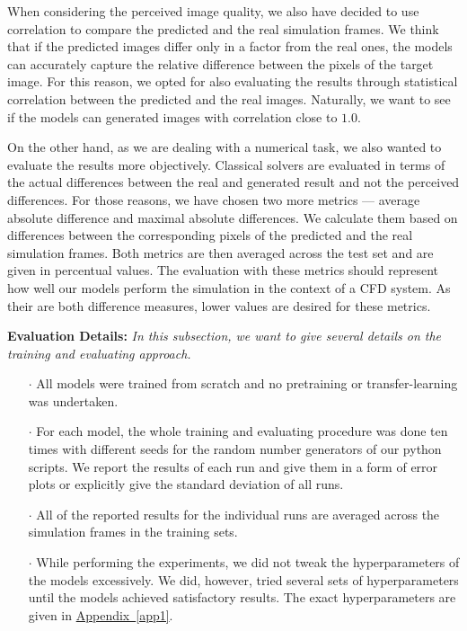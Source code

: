 \documentclass{llncs}
\newcommand{\refapp}[1]{\hyperref[#1]{Appendix~\ref*{#1}}}
\begin{document}
When considering the perceived image quality, we also have decided to use correlation to compare the predicted and the real simulation frames. We think that if the predicted images differ only in a factor from the real ones, the models can accurately capture the relative difference between the pixels of the target image. For this reason, we opted for also evaluating the results through statistical correlation between the predicted and the real images. Naturally, we want to see if the models can generated images with correlation close to $1.0$.

On the other hand, as we are dealing with a numerical task, we also wanted to evaluate the results more objectively. Classical solvers are evaluated in terms of the actual differences between the real and generated result and not the perceived differences. For those reasons, we have chosen two more metrics --- average absolute difference and maximal absolute differences. We calculate them based on differences between the corresponding pixels of the predicted and the real simulation frames. Both metrics are then averaged across the test set and are given in percentual values. The evaluation with these metrics should represent how well our models perform the simulation in the context of a CFD system. As their are both difference measures, lower values are desired for these metrics.

\noindent\textbf{Evaluation Details:}
\emph{In this subsection, we want to give several details on the training and evaluating approach.}
\begin{itemize}
\item[$\cdot$] All models were trained from scratch and no pretraining or transfer-learning was undertaken.
\item[$\cdot$] For each model, the whole training and evaluating procedure was done ten times with different seeds for the random number generators of our python scripts. We report the results of each run and give them in a form of error plots or explicitly give the standard deviation of all runs.
\item[$\cdot$] All of the reported results for the individual runs are averaged across the simulation frames in the training sets.
\item[$\cdot$] While performing the experiments, we did not tweak the hyperparameters of the models excessively. We did, however, tried several sets of hyperparameters until the models achieved satisfactory results. The exact hyperparameters are given in \refapp{app1}.
\end{itemize}
\end{document}
